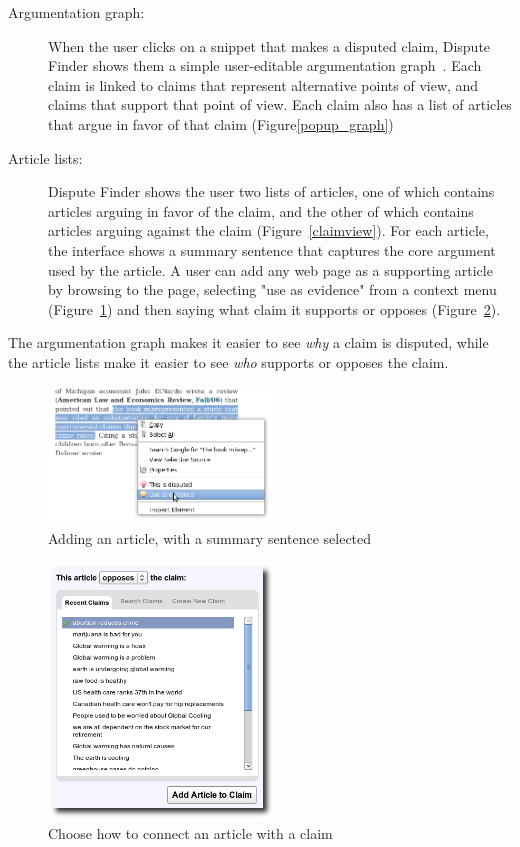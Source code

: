 \documentclass{www2010-submission}
\begin{document}
\begin{description}
\item[Argumentation graph:] When the user clicks on a snippet that makes a disputed claim, Dispute Finder shows them a simple user-editable argumentation graph~\cite{Conklin1987a}. Each claim is linked to claims that represent alternative points of view, and claims that support that point of view. Each claim also has a list of articles that argue in favor of that claim (Figure\ref{popup_graph})

\item[Article lists:] Dispute Finder shows the user two lists of articles, one of which contains articles arguing in favor of the claim, and the other of which contains articles arguing against the claim (Figure~\ref{claimview}). For each article, the interface shows a summary sentence that captures the core argument used by the article. A user can add any web page as a supporting article by browsing to the page, selecting "use as evidence" from a context menu (Figure~\ref{add_article}) and then saying what claim it supports or opposes (Figure~\ref{article_choose}).
\end{description}

The argumentation graph makes it easier to see {\it why} a claim is disputed, while the article lists make it easier to see {\it who} supports or opposes the claim. 

\begin{figure}[tb]
	\begin{center}
	\includegraphics[width=6cm]{pictures/mark_evidence.png}
	\caption{Adding an article, with a summary sentence selected}
	\label{add_article}
	\end{center}
\end{figure}

\begin{figure}[tb]
	\begin{center}
	\includegraphics[width=6cm]{pictures/article_choose_claim.png}
	\caption{Choose how to connect an article with a claim}
	\label{article_choose}
	\end{center}
\end{figure}
\end{document}
